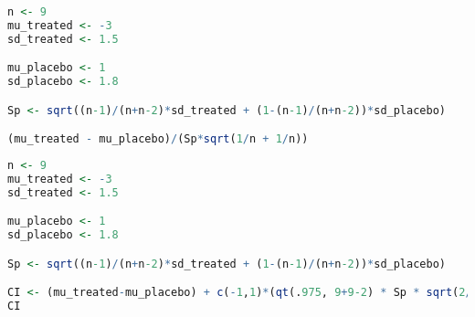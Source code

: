 \documentclass{homework}
\begin{document}
\begin{tcolorbox}[title=Question 5]
\end{tcolorbox}

\begin{lstlisting}[language=R]
n <- 9
mu_treated <- -3
sd_treated <- 1.5

mu_placebo <- 1
sd_placebo <- 1.8

Sp <- sqrt((n-1)/(n+n-2)*sd_treated + (1-(n-1)/(n+n-2))*sd_placebo)

(mu_treated - mu_placebo)/(Sp*sqrt(1/n + 1/n))
\end{lstlisting}

\begin{tcolorbox}[title=Question 6]
\end{tcolorbox}

\begin{lstlisting}[language=R]
n <- 9
mu_treated <- -3
sd_treated <- 1.5

mu_placebo <- 1
sd_placebo <- 1.8

Sp <- sqrt((n-1)/(n+n-2)*sd_treated + (1-(n-1)/(n+n-2))*sd_placebo)

CI <- (mu_treated-mu_placebo) + c(-1,1)*(qt(.975, 9+9-2) * Sp * sqrt(2/n))
CI
\end{lstlisting}

\begin{tcolorbox}[title=Question 7]
\end{tcolorbox}

\begin{tcolorbox}[title=Question 9]
\end{tcolorbox}

\begin{tcolorbox}[title=Question 10]
\end{tcolorbox}

\begin{tcolorbox}[title=Question 11]
\end{tcolorbox}

\begin{tcolorbox}[title=Question 12]
\end{tcolorbox}

\begin{tcolorbox}[title=Question 13]
\end{tcolorbox}

\begin{tcolorbox}[title=Question 14]
\end{tcolorbox}

\begin{tcolorbox}[title=Question 15]
\end{tcolorbox}
\end{document}
